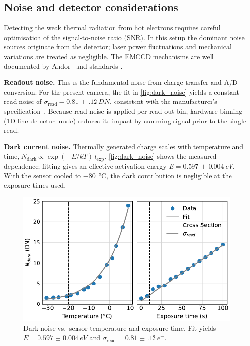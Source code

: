 \documentclass[
	parskip=half,
	a4paper,
]{scrarticle}
\begin{document}
\subsection{Noise and detector considerations}
Detecting the weak thermal radiation from hot electrons requires careful optimisation of the signal-to-noise ratio (SNR). In this setup the dominant noise sources originate from the detector; laser power fluctuations and mechanical variations are treated as negligible. The EMCCD mechanisms are well documented by Andor~\cite{dr.jowaltersSensitivityNoiseCCD2023,andorEstablishingSensitivityScientifica} and standards \cite{europeanmachinevisionassociationStandardCharacterizationImage2010}.

\textbf{Readout noise.}
This is the fundamental noise from charge transfer and A/D conversion. For the present camera, the fit in \autoref{fig:dark_noise} yields a constant read noise of
\(\sigma_{\text{read}}=\SI{0.81(12)}{DN}\), consistent with the manufacturer’s specification~\cite{andorIXonEM897Manual}.
Because read noise is applied per read out bin, hardware binning (1D line-detector mode) reduces its impact by summing signal prior to the single read.

\textbf{Dark current noise.}
Thermally generated charge scales with temperature and time,
\(N_\text{dark}\propto \exp(-E/kT)\,t_\text{exp}\).
\autoref{fig:dark_noise} shows the measured dependence; fitting gives an effective activation energy \(E=\SI{0.597(4)}{eV}\).
With the sensor cooled to \SI{-80}{\degreeCelsius}, the dark contribution is negligible at the exposure times used.

\begin{figure}
    \centering
    \includegraphics{../analysis/figures/dark_noise.pdf}
    \caption{Dark noise vs.\ sensor temperature and exposure time. Fit yields \(E=\SI{0.597(4)}{eV}\) and \(\sigma_{\text{read}}=\SI{0.81(12)}{e^{-}}\).}
    \label{fig:dark_noise}
\end{figure}
\end{document}
